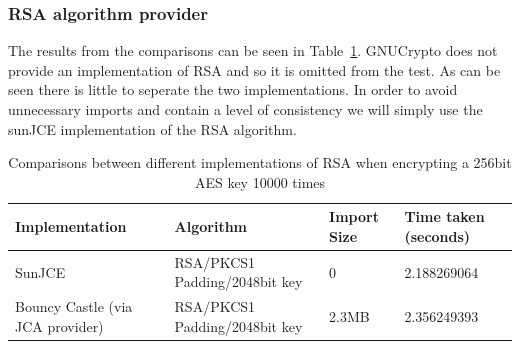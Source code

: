 \documentclass[12pt, titlepage]{article}
\begin{document}
\subsubsection*{RSA algorithm provider}
The results from the comparisons can be seen in Table~\ref{tab:rsaComparison}. GNUCrypto does not provide an implementation of RSA and so it is omitted from the test. As can be seen there is little to seperate the two implementations. In order to avoid unnecessary imports and contain a level of consistency we will simply use the sunJCE implementation of the RSA algorithm.

\begin{center}
\begin{table}
    \begin{tabular}{ | l | l | l | l |}
    \hline
    Implementation & Algorithm & Import Size & Time taken (seconds) \\ \hline
    
    SunJCE & RSA/PKCS1 Padding/2048bit key & 0 & 2.188269064 \\ \hline
    
     Bouncy Castle (via JCA provider) & RSA/PKCS1 Padding/2048bit key & 2.3MB & 2.356249393 \\ \hline
    
    \end{tabular}
    \caption{Comparisons between different implementations of RSA when encrypting a 256bit AES key 10000 times} \label{tab:rsaComparison}
    \end{table}
\end{center}
\end{document}
